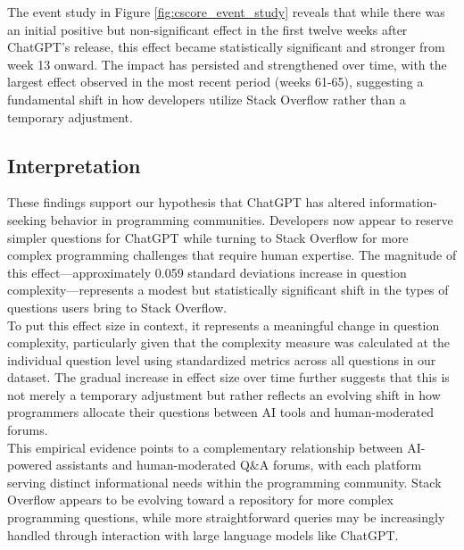 The event study in Figure \ref{fig:cscore_event_study} reveals that while there was an initial positive but non-significant effect in the first twelve weeks after ChatGPT's release, this effect became statistically significant and stronger from week 13 onward. The impact has persisted and strengthened over time, with the largest effect observed in the most recent period (weeks 61-65), suggesting a fundamental shift in how developers utilize Stack Overflow rather than a temporary adjustment.

\subsection{Interpretation}

These findings support our hypothesis that ChatGPT has altered information-seeking behavior in programming communities. Developers now appear to reserve simpler questions for ChatGPT while turning to Stack Overflow for more complex programming challenges that require human expertise. The magnitude of this effect—approximately 0.059 standard deviations increase in question complexity—represents a modest but statistically significant shift in the types of questions users bring to Stack Overflow.\\

To put this effect size in context, it represents a meaningful change in question complexity, particularly given that the complexity measure was calculated at the individual question level using standardized metrics across all questions in our dataset. The gradual increase in effect size over time further suggests that this is not merely a temporary adjustment but rather reflects an evolving shift in how programmers allocate their questions between AI tools and human-moderated forums.\\

This empirical evidence points to a complementary relationship between AI-powered assistants and human-moderated Q\&A forums, with each platform serving distinct informational needs within the programming community. Stack Overflow appears to be evolving toward a repository for more complex programming questions, while more straightforward queries may be increasingly handled through interaction with large language models like ChatGPT.